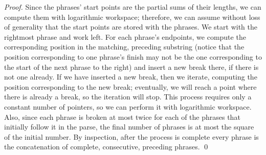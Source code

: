 \documentclass[runningheads]{llncs}
\begin{document}
\begin{proof}
Since the phrases' start points are the partial sums of their lengths, we can compute them with logarithmic workspace; therefore, we can assume without loss of generality that the start points are stored with the phrases.  We start with the rightmost phrase and work left.  For each phrase's endpoints, we compute the corresponding position in the matching, preceding substring (notice that the position corresponding to one phrase's finish may not be the one corresponding to the start of the next phrase to the right) and insert a new break there, if there is not one already.  If we have inserted a new break, then we iterate, computing the position corresponding to the new break; eventually, we will reach a point where there is already a break, so the iteration will stop.  This process requires only a constant number of pointers, so we can perform it with logarithmic workspace.  Also, since each phrase is broken at most twice for each of the phrases that initially follow it in the parse, the final number of phrases is at most the square of the initial number.  By inspection, after the process is complete every phrase is the concatenation of complete, consecutive, preceding phrases. \qed
\end{proof}
\end{document}
